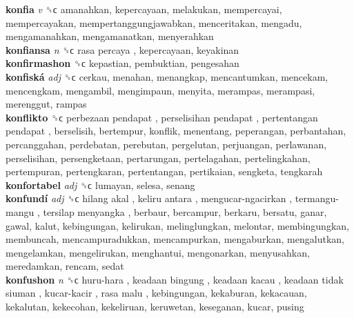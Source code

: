\textbf{konfia} \emph{v}  ␝ϲ  amanahkan, kepercayaan, melakukan, mempercayai, mempercayakan, mempertanggungjawabkan, menceritakan, mengadu, mengamanahkan, mengamanatkan, menyerahkan  \\
\textbf{konfiansa} \emph{n}  ␝ϲ   rasa percaya , kepercayaan, keyakinan  \\
\textbf{konfirmashon} ␝ϲ  kepastian, pembuktian, pengesahan  \\
\textbf{konfiská} \emph{adj}  ␝ϲ  cerkau, menahan, menangkap, mencantumkan, mencekam, mencengkam, mengambil, mengimpaun, menyita, merampas, merampasi, merenggut, rampas  \\
\textbf{konflikto} ␝ϲ   perbezaan pendapat ,  perselisihan pendapat ,  pertentangan pendapat , berselisih, bertempur, konflik, menentang, peperangan, perbantahan, percanggahan, perdebatan, perebutan, pergelutan, perjuangan, perlawanan, perselisihan, persengketaan, pertarungan, pertelagahan, pertelingkahan, pertempuran, pertengkaran, pertentangan, pertikaian, sengketa, tengkarah  \\
\textbf{konfortabel} \emph{adj}  ␝ϲ  lumayan, selesa, senang  \\
\textbf{konfundí} \emph{adj}  ␝ϲ   hilang akal ,  keliru antara ,  mengucar-ngacirkan ,  termangu-mangu ,  tersilap menyangka , berbaur, bercampur, berkaru, bersatu, ganar, gawal, kalut, kebingungan, kelirukan, melinglungkan, melontar, membingungkan, membuncah, mencampuradukkan, mencampurkan, mengaburkan, mengalutkan, mengelamkan, mengelirukan, menghantui, mengonarkan, menyusahkan, meredamkan, rencam, sedat  \\
\textbf{konfushon} \emph{n}  ␝ϲ   huru-hara ,  keadaan bingung ,  keadaan kacau ,  keadaan tidak siuman ,  kucar-kacir ,  rasa malu , kebingungan, kekaburan, kekacauan, kekalutan, kekecohan, kekeliruan, keruwetan, keseganan, kucar, pusing  \\
